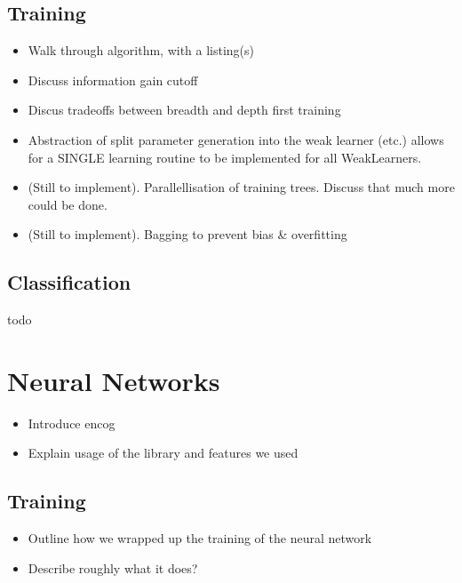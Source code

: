 \documentclass[12pt,twoside,notitlepage]{report}
\begin{document}
      \subsection{Training} \label{sec:training}
          \begin{framed}
              \begin{itemize}
                  \item Walk through algorithm, with a listing(s)
                  \item Discuss information gain cutoff
                  \item Discus tradeoffs between breadth and depth first training
                  \item Abstraction of split parameter generation into the weak learner (etc.) allows for a SINGLE learning routine to be implemented for all WeakLearners.
                  \item (Still to implement). Parallellisation of training trees. Discuss that much more could be done.
                  \item (Still to implement). Bagging to prevent bias \& overfitting
              \end{itemize}
          \end{framed}




      \subsection{Classification} \label{sec:classification}
          \begin{framed}
              todo
          \end{framed}

    \section{Neural Networks}
        \begin{framed}
            \begin{itemize}
                \item Introduce encog
                \item Explain usage of the library and features we used
            \end{itemize}
        \end{framed}

        \subsection{Training}
            \begin{framed}
                \begin{itemize}
                    \item Outline how we wrapped up the training of the neural network
                    \item Describe roughly what it does?
                \end{itemize}
            \end{framed}
\end{document}
